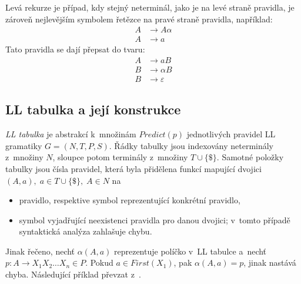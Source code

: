Levá rekurze je případ, kdy stejný neterminál, jako je na levé straně pravidla, je zároveň nejlevějším symbolem řetězce na pravé straně pravidla, například:
\begin{align*}
    A &\rightarrow A\alpha\\
    A &\rightarrow a
\end{align*}
Tato pravidla se dají přepsat do tvaru:
\begin{align*}
    A &\rightarrow aB\\
    B &\rightarrow \alpha B\\
    B &\rightarrow \varepsilon
\end{align*}

\subsection*{LL tabulka a její konstrukce}
\emph{LL tabulka} je abstrakcí k~množinám $Predict(p)$ jednotlivých pravidel LL gramatiky $G = (N, T, P, S)$.
Řádky tabulky jsou indexovány neterminály z~množiny $N$, sloupce potom terminály z~množiny $T \cup \{\$\}$.
Samotné položky tabulky jsou čísla pravidel, která byla přidělena funkcí mapující dvojici $(A, a),\; a \in T \cup \{\$\},\; A \in N$ na 
\begin{itemize}
    \item pravidlo, respektive symbol reprezentující konkrétní pravidlo,
    \item symbol vyjadřující neexistenci pravidla pro danou dvojici; v~tomto případě syntaktická analýza zahlašuje chybu.
\end{itemize}
Jinak řečeno, nechť $\alpha(A, a)$ reprezentuje políčko v~LL tabulce a~nechť $p: A \rightarrow X_1X_2\ldots X_n \in P$.
Pokud $a \in First(X_1)$, pak $\alpha(A, a) = p$, jinak nastává chyba.
Následující příklad převzat z~\cite{medunaElementsOfCompDesign}.
